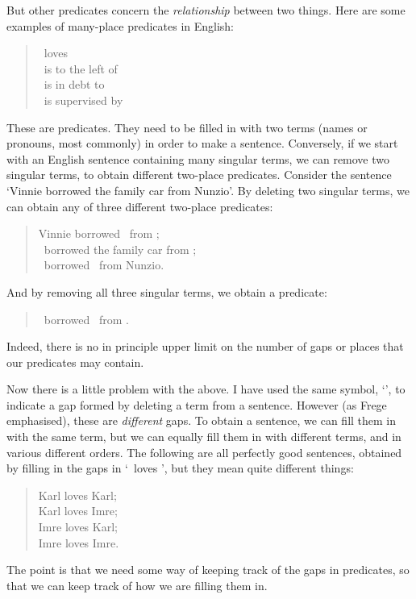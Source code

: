 But other predicates concern the \emph{relationship} between two things. Here are some examples of many-place predicates in English:
	\begin{quote}
		\blank\ loves \blank\\
		\blank\ is to the left of \blank\\
		\blank\ is in debt to \blank\\
		\blank\ is supervised by \blank
	\end{quote}
These are  predicates. They need to be filled in with two terms (names or pronouns, most commonly) in order to make a sentence. Conversely, if we start with an English sentence containing many singular terms, we can remove two singular terms, to obtain different two-place predicates. Consider the sentence `Vinnie borrowed the family car from Nunzio'. By deleting two singular terms, we can obtain any of three different two-place predicates:
	\begin{quote}
		Vinnie borrowed \blank\ from \blank;\\
		\blank\ borrowed the family car from \blank;\\
		\blank\ borrowed \blank\ from Nunzio.
	\end{quote}
And by removing all three singular terms, we  obtain a  predicate:
	\begin{quote}
		\blank\ borrowed \blank\ from \blank.
	\end{quote}
Indeed, there is no in principle upper limit on the number of gaps or places that our predicates may contain.

Now there is a little problem with the above. I have used the same symbol, `\blank', to indicate a gap formed by deleting a term from a sentence. However (as Frege emphasised), these are \emph{different} gaps. To obtain a sentence, we can fill them in with the same term, but we can equally fill them in with different terms, and in various different orders. The following are all perfectly good sentences, obtained by filling in the gaps in `\blank\ loves \blank', but they mean quite different things:
	\begin{quote}
		Karl loves Karl;\\
		Karl loves Imre;\\
		Imre loves Karl;\\
		Imre loves Imre.
	\end{quote}
The point is that we need some way of keeping track of the gaps in predicates, so that we can keep track of how we are filling them in. 

